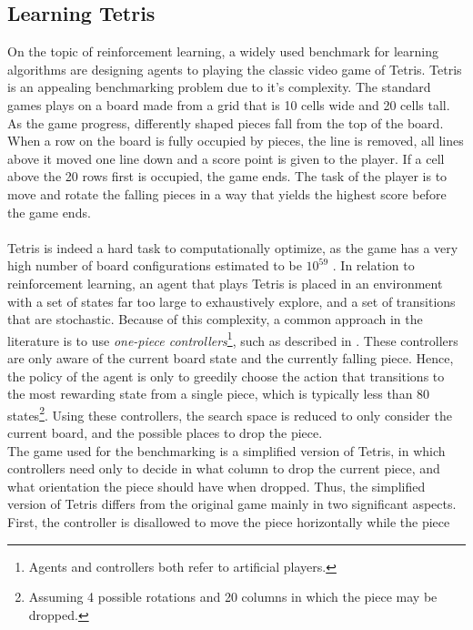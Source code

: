 \subsection{Learning Tetris \label{sec:learningTetris}}

On the topic of reinforcement learning, a widely used benchmark
for learning algorithms are designing agents 
to playing the classic video game of Tetris. Tetris is an 
appealing benchmarking problem due to it's complexity. The 
standard games plays on a board made from a grid that is
10 cells wide and 20 cells tall. As the game progress, differently
shaped pieces fall from the top of the board. 
When a row on the board is fully occupied by pieces, the line
is removed, all lines above it moved one line down and a score
point is given to the player. If a cell above the 20 rows first is
occupied, the game ends. The task of the player is to move
and rotate the falling pieces in a way that yields the highest 
score before the game ends.\\
\\
Tetris is indeed a hard task to computationally optimize, as
the game has a very high number of board configurations estimated to be
$10^{59}$ \citep{scherrer2009}. In relation to reinforcement learning,
an agent that plays Tetris is placed in an environment with a set of 
states far too large to exhaustively explore, and a set of transitions
that are stochastic. Because of this
complexity, a common approach 
in the literature is to use 
\textit{one-piece controllers}\footnote{Agents and controllers
both refer to artificial players.}, such as described in 
\cite{scherrer2009:b}. These controllers are only aware of
the current board state and the currently falling piece.
Hence, the policy of the agent is only to greedily choose
the action that transitions to the most rewarding state
from a single piece, which is typically less than 80 states\footnote{
Assuming 4 possible rotations and 20 columns
in which the piece may be dropped.}.
Using these controllers, the search space is reduced 
to only consider the current board, and the possible 
places to drop the piece. \\
The game used for the benchmarking is a simplified version of Tetris,
in which 
controllers need only to decide in what column to drop the current
piece, and what orientation the piece should have when dropped.
Thus, the simplified version of Tetris differs from the 
original game mainly in two significant aspects. 
First, the controller is 
disallowed to move the piece horizontally while the piece 
